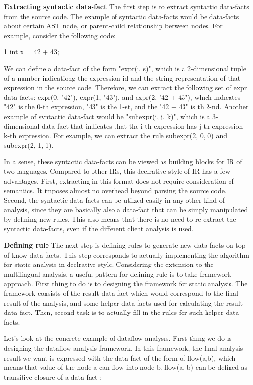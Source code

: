 \textbf{Extracting syntactic data-fact}
The first step is to extract syntactic data-facts from the source code.
The example of syntactic data-facts would be data-facts about certain
AST node, or parent-child relationship between nodes. For example, consider
the following code:

1 int x = 42 + 43;

We can define a data-fact of the form "expr(i, s)", which is a 2-dimensional
tuple of a number indicationg the expression id and the string representation
of that expression in the source code.  Therefore, we can extract the following
set of expr data-facts: expr(0, "42"), expr(1, "43"), and expr(2, "42 + 43"),
which indicates "42" is the 0-th expression, "43" is the 1-st, and the "42 +
43" is th 2-nd.  Another example of syntactic data-fact would be "subexpr(i, j,
k)", which is a 3-dimensional data-fact that indicates that the i-th expression
has j-th expression k-th expression. For example, we can extract the rule
subexpr(2, 0, 0) and subexpr(2, 1, 1).

In a sense, these syntactic data-facts can be viewed as building blocks for IR
of two languages.  Compared to other IRs, this declrative style of IR has a few
advantages. First, extracting in this format does not require consideration of
semantics.  It imposes almost no overhead beyond parsing the source code.
Second, the syntactic data-facts can be utilzed easily in any other kind of
analysis, since they are basically also a data-fact that can be simply
manipulated by defining new rules.  This also means that there is no need to
re-extract the syntactic data-facts, even if the different client analysis is
used.

\textbf{Defining rule}
The next step is defining rules to generate new data-facts on top of know
data-facts. This step corresponds to actually implementing the algorithm for
static analysis in declrative style. Considering the extension to the
multilingual analysis, a useful pattern for defining rule is to take framework
approach.  First thing to do is to designing the framework for static analysis.
The framework consists of the result data-fact which would correspond to the
final result of the analysis, and some helper data-facts used for calculating
the result data-fact. Then, second task is to actually fill in the rules for
such helper data-facts.

Let's look at the concrete example of dataflow analysis. First thing we do is
designing the dataflow analysis framework.  In this framework, the final
analysis result we want is expressed with the data-fact of the form of
flow(a,b), which means that value of the node a can flow into node b. flow(a,
b) can be defined as transitive closure of a data-fact ;

